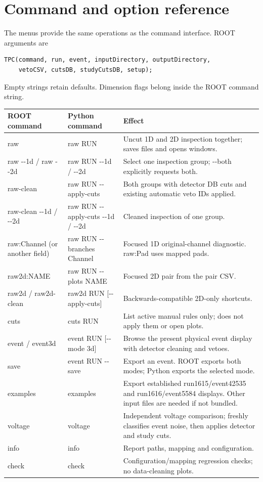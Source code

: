 \documentclass[11pt,a4paper]{article}
\begin{document}
\section{Command and option reference}
The menus provide the same operations as the command interface. ROOT arguments are
\begin{lstlisting}
TPC(command, run, event, inputDirectory, outputDirectory,
    vetoCSV, cutsDB, studyCutsDB, setup);
\end{lstlisting}
Empty strings retain defaults. Dimension flags belong inside the ROOT command string.
\begin{longtable}{p{.22\linewidth}p{.27\linewidth}p{.41\linewidth}}
\toprule ROOT command & Python command & Effect \\\midrule
raw & raw RUN & Uncut 1D and 2D inspection together; saves files and opens windows.\\
raw -{}-1d / raw -{}-2d & raw RUN -{}-1d / -{}-2d & Select one inspection group; -{}-both explicitly requests both.\\
raw-clean & raw RUN -{}-apply-cuts & Both groups with detector DB cuts and existing automatic veto IDs applied.\\
raw-clean -{}-1d / -{}-2d & raw RUN -{}-apply-cuts -{}-1d / -{}-2d & Cleaned inspection of one group.\\
raw:Channel (or another field) & raw RUN -{}-branches Channel & Focused 1D original-channel diagnostic. raw:Pad uses mapped pads.\\
raw2d:NAME & raw RUN -{}-plots NAME & Focused 2D pair from the pair CSV.\\
raw2d / raw2d-clean & raw2d RUN [-{}-apply-cuts] & Backwards-compatible 2D-only shortcuts.\\
cuts & cuts RUN & List active manual rules only; does not apply them or open plots.\\
event / event3d & event RUN [-{}-mode 3d] & Browse the present physical event display with detector cleaning and vetoes.\\
save & event RUN -{}-save & Export an event. ROOT exports both modes; Python exports the selected mode.\\
examples & examples & Export established run1615/event42535 and run1616/event5584 displays. Other input files are needed if not bundled.\\
voltage & voltage & Independent voltage comparison; freshly classifies event noise, then applies detector and study cuts.\\
info & info & Report paths, mapping and configuration.\\
check & check & Configuration/mapping regression checks; no data-cleaning plots.\\
\bottomrule
\end{longtable}
\end{document}
